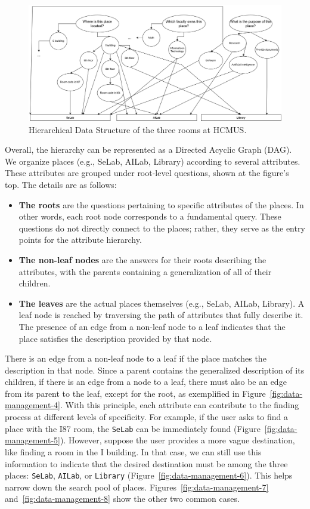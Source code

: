 \begin{figure}[ht]
  \centering
  \includegraphics[scale=0.2]{content/resources/images/chap-problems-solutions/data-management-3.png}
  \caption{Hierarchical Data Structure of the three rooms at HCMUS.}
  \label{fig:data-management-3}
\end{figure}

Overall, the hierarchy can be represented as a Directed Acyclic Graph (DAG). We organize places (e.g., SeLab, AILab, Library) according to several attributes. These attributes are grouped under root-level questions, shown at the figure's top. The details are as follows:
\begin{itemize}
\item \textbf{The roots} are the questions pertaining to specific attributes of the places. In other words, each root node corresponds to a fundamental query. These questions do not directly connect to the places; rather, they serve as the entry points for the attribute hierarchy.
\item \textbf{The non-leaf nodes} are the answers for their roots describing the attributes, with the parents containing a generalization of all of their children.
\item \textbf{The leaves} are the actual places themselves (e.g., SeLab, AILab, Library). A leaf node is reached by traversing the path of attributes that fully describe it. The presence of an edge from a non-leaf node to a leaf indicates that the place satisfies the description provided by that node.
\end{itemize}

There is an edge from a non-leaf node to a leaf if the place matches the description in that node. Since a parent contains the generalized description of its children, if there is an edge from a node to a leaf, there must also be an edge from its parent to the leaf, except for the root, as exemplified in Figure~\ref{fig:data-management-4}. With this principle, each attribute can contribute to the finding process at different levels of specificity. For example, if the user asks to find a place with the I87 room, the \texttt{SeLab} can be immediately found (Figure~\ref{fig:data-management-5}). However, suppose the user provides a more vague destination, like finding a room in the I building. In that case, we can still use this information to indicate that the desired destination must be among the three places: \texttt{SeLab}, \texttt{AILab}, or \texttt{Library} (Figure~\ref{fig:data-management-6}). This helps narrow down the search pool of places. Figures~\ref{fig:data-management-7} and~\ref{fig:data-management-8} show the other two common cases.

